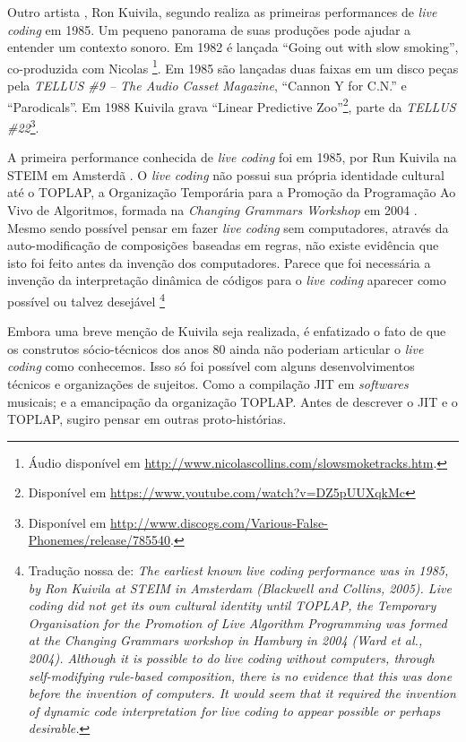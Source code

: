 Outro artista , Ron Kuivila, segundo  realiza as primeiras performances de \emph{live coding} em 1985. Um pequeno panorama de suas produções pode ajudar a entender um contexto sonoro. Em 1982 é lançada ``Going out with slow smoking'', co-produzida com Nicolas \footnote{Áudio disponível em \url{http://www.nicolascollins.com/slowsmoketracks.htm}.}. Em 1985 são lançadas duas faixas em um disco peças pela \emph{TELLUS \#9 -- The Audio Casset Magazine}, ``Cannon Y for C.N.'' e ``Parodicals''. Em 1988 Kuivila grava ``Linear Predictive Zoo''\footnote{Disponível em \url{https://www.youtube.com/watch?v=DZ5pUUXqkMc}}, parte da \emph{TELLUS \#22}\footnote{Disponível em \url{http://www.discogs.com/Various-False-Phonemes/release/785540}.}.

\begin{citacao}
A primeira performance conhecida de \emph{live coding} foi em 1985, por Run Kuivila na STEIM em Amsterdã \cite{blackwell_programming_2005}. O \emph{live coding} não possui sua própria identidade cultural até o TOPLAP, a Organização Temporária para a Promoção da Programação Ao Vivo de Algoritmos, formada na \emph{Changing Grammars Workshop} em 2004 \cite{ward_live_2004}. Mesmo sendo possível pensar em fazer \emph{live coding} sem computadores, através da auto-modificação de composições baseadas em regras, não existe evidência que isto foi feito antes da invenção dos computadores. Parece que foi necessária a invenção da interpretação dinâmica de códigos para o \emph{live coding} aparecer como possível ou talvez desejável \cite[p.~1-2]{mclean_patterns_2009}\footnote{Tradução nossa de: \emph{The earliest known live coding performance was in 1985, by Ron Kuivila at STEIM in Amsterdam (Blackwell and Collins, 2005). Live coding did not get its own cultural identity until TOPLAP, the Temporary Organisation for the Promotion of Live Algorithm Programming was formed at the Changing Grammars workshop in Hamburg in 2004 (Ward et al., 2004). Although it is possible to do live coding without computers, through self-modifying rule-based composition, there is no evidence that this was done before the invention of computers. It would seem that it required the invention of dynamic code interpretation for live coding to appear possible or perhaps desirable.}}
\end{citacao}

Embora uma breve menção de Kuivila seja realizada, é enfatizado o fato de que os construtos sócio-técnicos dos anos 80 ainda não poderiam articular o \emph{live coding} como conhecemos. Isso só foi possível com alguns desenvolvimentos técnicos e organizações de sujeitos. Como a compilação JIT \cite{aycock_brief_2003} em \emph{softwares} musicais; e a emancipação da organização TOPLAP. Antes de descrever o JIT e o TOPLAP, sugiro pensar em outras proto-histórias.

